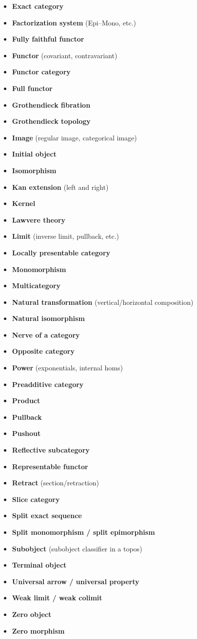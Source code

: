 \begin{itemize}
\item \textbf{Exact category}
\item \textbf{Factorization system} (Epi--Mono, etc.)
\item \textbf{Fully faithful functor}
\item \textbf{Functor} (covariant, contravariant)
\item \textbf{Functor category}
\item \textbf{Full functor}
\item \textbf{Grothendieck fibration}
\item \textbf{Grothendieck topology}
\item \textbf{Image} (regular image, categorical image)
\item \textbf{Initial object}
\item \textbf{Isomorphism}
\item \textbf{Kan extension} (left and right)
\item \textbf{Kernel}
\item \textbf{Lawvere theory}
\item \textbf{Limit} (inverse limit, pullback, etc.)
\item \textbf{Locally presentable category}
\item \textbf{Monomorphism}
\item \textbf{Multicategory}
\item \textbf{Natural transformation} (vertical/horizontal composition)
\item \textbf{Natural isomorphism}
\item \textbf{Nerve of a category}
\item \textbf{Opposite category}
\item \textbf{Power} (exponentials, internal homs)
\item \textbf{Preadditive category}
\item \textbf{Product}
\item \textbf{Pullback}
\item \textbf{Pushout}
\item \textbf{Reflective subcategory}
\item \textbf{Representable functor}
\item \textbf{Retract} (section/retraction)
\item \textbf{Slice category}
\item \textbf{Split exact sequence}
\item \textbf{Split monomorphism / split epimorphism}
\item \textbf{Subobject} (subobject classifier in a topos)
\item \textbf{Terminal object}
\item \textbf{Universal arrow / universal property}
\item \textbf{Weak limit / weak colimit}
\item \textbf{Zero object}
\item \textbf{Zero morphism}
\end{itemize}

